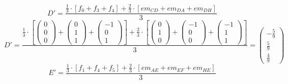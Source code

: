 \documentclass{article}
\begin{document}
\[D'=\frac{\frac{1}{3}\cdot\left[f_0+f_3+f_4\right]+
\frac{2}{3}\cdot\left[em_{CD}+em_{DA}+em_{DH}\right]
}{3}\]
\[D'=\frac{\frac{1}{3}\cdot\left[
\left({\begin{array}{c} 0 \\  0 \\ 0 \end{array}}\right)+
\left({\begin{array}{c} 0 \\  1 \\ 1 \end{array}}\right)+
\left({\begin{array}{c} -1 \\  0 \\ 1 \end{array}}\right)\right]+
\frac{2}{3}\cdot\left[
\left({\begin{array}{c} 0 \\  1 \\ 0 \end{array}}\right)+
\left({\begin{array}{c} -1 \\  0 \\ 0 \end{array}}\right)+
\left({\begin{array}{c} -1 \\  1 \\ 1 \end{array}}\right)\right]
}{3}=\left({\begin{array}{c} -\frac{5}{9} \\  \frac{5}{9} \\ \frac{4}{9} \end{array}}\right)\]
\[E'=\frac{\frac{1}{3}\cdot\left[f_1+f_4+f_5\right]+
\frac{2}{3}\cdot\left[em_{AE}+em_{EF}+em_{HE}\right]
}{3}\]
\end{document}
